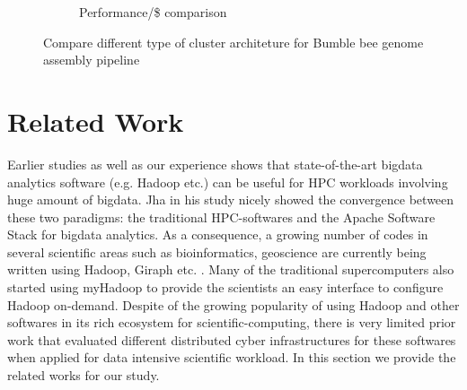 \documentclass[conference]{IEEEtran}
\begin{document}
\begin{figure}[htb]
\begin{subfigure}[b]{0.5\textwidth}
                \caption{Performance/\$ comparison}
                \label{fig:DifferentArchitecturesPerfPerDollar}
        \end{subfigure}
        \caption{Compare different type of cluster architeture for Bumble bee genome assembly pipeline}
  \label{fig:DifferentArchitectures}
\end{figure}

\section {Related Work} \label{Related Work}
Earlier studies \cite{schadoop:fadika} \cite{schadoop:jha} as well as our experience shows that state-of-the-art bigdata analytics software (e.g. Hadoop etc.) can be useful for HPC workloads involving huge amount of bigdata.
Jha \cite{schadoop:jha} in his study nicely showed the convergence between these two paradigms: the traditional HPC-softwares and the Apache Software Stack for bigdata analytics.
As a consequence, a growing number of codes in several scientific areas such as bioinformatics, geoscience are currently being written using Hadoop, Giraph etc. \cite{fw:myhadoop}.
Many of the traditional supercomputers also started using myHadoop \cite{fw:myhadoop} to provide the scientists an easy interface to configure Hadoop on-demand. 
Despite of the growing popularity of using Hadoop and other softwares in its rich ecosystem for scientific-computing, there is very limited prior work that evaluated different distributed cyber infrastructures for these softwares when applied for data intensive scientific workload.
In this section we provide the related works for our study.
\end{document}
